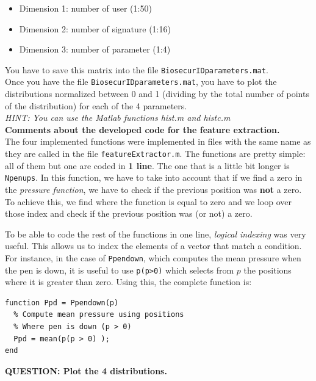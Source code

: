 \documentclass[a4paper]{article}
\def\inline{\lstinline[basicstyle=\ttfamily,keywordstyle={}]}
\begin{document}
{\begin{itemize}
\item	Dimension 1: number of user (1:50)
\item	Dimension 2: number of signature (1:16)
\item Dimension 3: number of parameter (1:4)
\end{itemize}

You have to save this matrix into the file \inline{BiosecurIDparameters.mat}.\\

Once you have the file \inline{BiosecurIDparameters.mat}, you have to plot the distributions normalized between 0 and 1 (dividing by the total number of points of the distribution) for each of the 4 parameters. \\
\emph{HINT: You can use the Matlab functions hist.m and histc.m}\\

\textbf{Comments about the developed code for the feature extraction.}\\

The four implemented functions were implemented in files with the same name as they are called in the file \inline{featureExtractor.m}. The functions are pretty simple: all of them but one are coded in \textbf{1 line}. The one that is a little bit longer is \inline{Npenups}. In this function, we have to take into account that if we find a zero in the \emph{pressure function}, we have to check if the previous position was \textbf{not} a zero. To achieve this, we find where the function is equal to zero and we loop over those index and check if the previous position was (or not) a zero.

To be able to code the rest of the functions in one line, \emph{logical indexing} was very useful. This allows us to index the elements of a vector that match a condition. For instance, in the case of \inline{Ppendown}, which computes the mean pressure when the pen is down, it is useful to use \inline{p(p>0)} which selects from \(p\) the positions where it is greater than zero. Using this, the complete function is:

\begin{verbatim}
function Ppd = Ppendown(p)
  % Compute mean pressure using positions 
  % Where pen is down (p > 0)
  Ppd = mean(p(p > 0) );
end
\end{verbatim}

\newpage

\textbf{QUESTION:  Plot the 4 distributions.}\\

}
\end{document}
